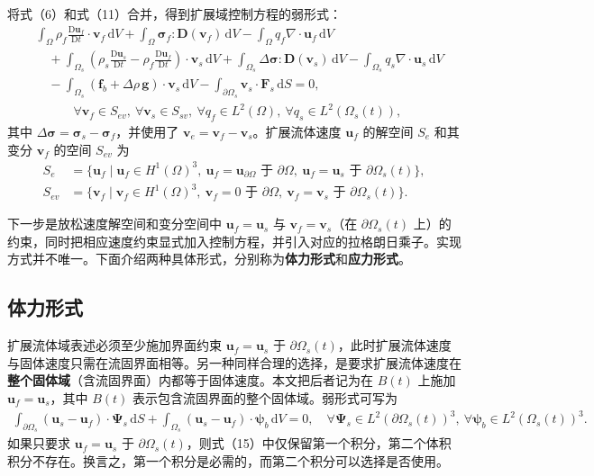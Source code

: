 \documentclass[UTF8,11pt,a4paper]{ctexart}
\newcommand{\dd}{\,\mathrm{d}}
\newcommand{\D}{\mathrm{D}}
\begin{document}
将式（6）和式（11）合并，得到扩展域控制方程的弱形式：
\begin{align}
&\int_{\Omega}\rho_f\frac{\D\bm u_f}{\D t}\cdot\bm v_f\dd V
+\int_{\Omega}\bm\sigma_f:\bm D(\bm v_f)\dd V
-\int_{\Omega}q_f\nabla\cdot\bm u_f\dd V \nonumber\\
&\quad+\int_{\Omega_s}\left(\rho_s\frac{\D\bm u_s}{\D t}-\rho_f\frac{\D\bm u_f}{\D t}\right)\cdot\bm v_s\dd V
+\int_{\Omega_s}\Delta\bm\sigma:\bm D(\bm v_s)\dd V
-\int_{\Omega_s}q_s\nabla\cdot\bm u_s\dd V \nonumber\\
&\quad-\int_{\Omega_s}(\bm f_b+\Delta\rho\,\bm g)\cdot\bm v_s\dd V
-\int_{\partial\Omega_s}\bm v_s\cdot\bm F_s\dd S=0,\nonumber\\[-0.2em]
&\hspace{3em}\forall\bm v_f\in S_{ev},\ \forall\bm v_s\in S_{sv},\ \forall q_f\in L^2(\Omega),\ \forall q_s\in L^2(\Omega_s(t)), \tag{12}
\end{align}
其中 $\Delta\bm\sigma=\bm\sigma_s-\bm\sigma_f$，并使用了 $\bm v_e=\bm v_f-\bm v_s$。扩展流体速度 $\bm u_f$ 的解空间 $S_e$ 和其变分 $\bm v_f$ 的空间 $S_{ev}$ 为
\begin{align}
S_e&=\{\bm u_f\mid \bm u_f\in H^1(\Omega)^3,\ \bm u_f=\bm u_{\partial\Omega}\text{ 于 }\partial\Omega,\ \bm u_f=\bm u_s\text{ 于 }\partial\Omega_s(t)\}, \tag{13}\\
S_{ev}&=\{\bm v_f\mid \bm v_f\in H^1(\Omega)^3,\ \bm v_f=0\text{ 于 }\partial\Omega,\ \bm v_f=\bm v_s\text{ 于 }\partial\Omega_s(t)\}. \tag{14}
\end{align}

下一步是放松速度解空间和变分空间中 $\bm u_f=\bm u_s$ 与 $\bm v_f=\bm v_s$（在 $\partial\Omega_s(t)$ 上）的约束，同时把相应速度约束显式加入控制方程，并引入对应的拉格朗日乘子。实现方式并不唯一。下面介绍两种具体形式，分别称为\textbf{体力形式}和\textbf{应力形式}。

\subsection{体力形式}

扩展流体域表述必须至少施加界面约束 $\bm u_f=\bm u_s$ 于 $\partial\Omega_s(t)$，此时扩展流体速度与固体速度只需在流固界面相等。另一种同样合理的选择，是要求扩展流体速度在\textbf{整个固体域}（含流固界面）内都等于固体速度。本文把后者记为在 $B(t)$ 上施加 $\bm u_f=\bm u_s$，其中 $B(t)$ 表示包含流固界面的整个固体域。弱形式可写为
\begin{align}
\int_{\partial\Omega_s}(\bm u_s-\bm u_f)\cdot\bm\Psi_s\dd S
+\int_{\Omega_s}(\bm u_s-\bm u_f)\cdot\bm\psi_b\dd V=0,
\quad \forall\bm\Psi_s\in L^2(\partial\Omega_s(t))^3,\ \forall\bm\psi_b\in L^2(\Omega_s(t))^3. \tag{15}
\end{align}
如果只要求 $\bm u_f=\bm u_s$ 于 $\partial\Omega_s(t)$，则式（15）中仅保留第一个积分，第二个体积积分不存在。换言之，第一个积分是必需的，而第二个积分可以选择是否使用。
\end{document}
